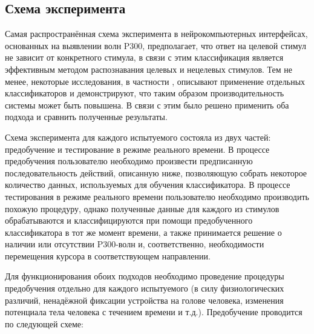 \documentclass[12pt,a4paper,oneside,fleqn,leqno]{article}
\begin{document}
\subsection{Схема эксперимента}
	\par Самая распространённая схема эксперимента в нейрокомпьютерных интерфейсах, основанных на выявлении волн P300, предполагает, что ответ на целевой стимул не зависит от конкретного стимула, в связи с этим классификация является эффективным методом распознавания целевых и нецелевых стимулов. Тем не менее, некоторые исследования, в частности \cite{ensemble}, описывают применение отдельных классификаторов и демонстрируют, что таким образом производительность системы может быть повышена. В связи с этим было решено применить оба подхода и сравнить полученные результаты.
	\par Схема эксперимента для каждого испытуемого состояла из двух частей: предобучение и тестирование в режиме реального времени. В процессе предобучения пользователю необходимо произвести предписанную последовательность действий, описанную ниже, позволяющую собрать некоторое количество данных, используемых для обучения классификатора. В процессе тестирования в режиме реального времени пользователю необходимо производить похожую процедуру, однако полученные данные для каждого из стимулов обрабатываются и классифицируются при помощи предобученного классификатора в тот же момент времени, а также принимается решение о наличии или отсутствии P300-волн и, соответственно, необходимости перемещения курсора в соответствующем направлении.
	\par Для функционирования обоих подходов необходимо проведение процедуры предобучения отдельно для каждого испытуемого (в силу физиологических различий, ненадёжной фиксации устройства на голове человека, изменения потенциала тела человека с течением времени и т.д.). Предобучение проводится по следующей схеме:
\end{document}
